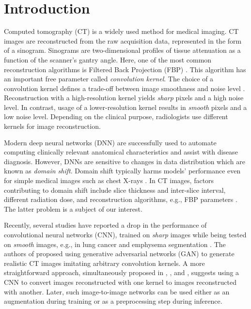 \section{Introduction}

Computed tomography (CT) is a widely used method for medical imaging. CT images are reconstructed from the raw acquisition data, represented in the form of a sinogram. Sinograms are two-dimensional profiles of tissue attenuation as a function of the scanner's gantry angle. Here, one of the most common reconstruction algorithms is Filtered Back Projection (FBP) \cite{schofield2020image}. This algorithm has an important free parameter called \textit{convolution kernel}. The choice of a convolution kernel defines a trade-off between image smoothness and noise level \cite{schaller2003spatial}. Reconstruction with a high-resolution kernel yields \textit{sharp} pixels and a high noise level. In contrast, usage of a lower-resolution kernel results in \textit{smooth} pixels and a low noise level. Depending on the clinical purpose, radiologists use different kernels for image reconstruction.

Modern deep neural networks (DNN) are successfully used to automate computing clinically relevant anatomical characteristics and assist with disease diagnosis. However, DNNs are sensitive to changes in data distribution which are known as \textit{domain shift}. Domain shift typically harms models' performance even for simple medical images such as chest X-rays \cite{zech2018variable}. In CT images, factors contributing to domain shift include slice thickness and inter-slice interval, different radiation dose, and reconstruction algorithms, e.g., FBP parameters \cite{kloenne2020domain}. The latter problem is a subject of our interest.

Recently, several studies have reported a drop in the performance of convolutional neural networks (CNN), trained on \textit{sharp} images while being tested on \textit{smooth} images, e.g., in lung cancer \cite{choe2019deep} and emphysema segmentation \cite{lee2019ct}. The authors of \cite{sandfort2019data} proposed using generative adversarial networks (GAN) to generate realistic CT images imitating arbitrary convolution kernels. A more straightforward approach, simultaneously proposed in \cite{missert2019simulation}, \cite{choe2019deep}, and \cite{lee2019ct}, suggests using a CNN to convert images reconstructed with one kernel to images reconstructed with another. Later, such image-to-image networks can be used either as an augmentation during training or as a preprocessing step during inference.

